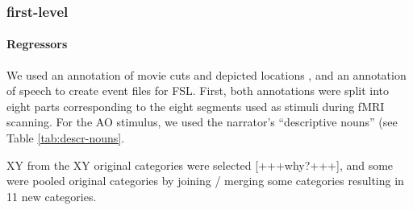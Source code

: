 \documentclass[english]{article}
\begin{document}
\subsubsection{first-level}
\paragraph{Regressors}
We used an annotation of movie cuts and depicted locations \citep{haeusler2016cutanno}, and an annotation of speech \citep{haeusler2020speechanno} to create event files for FSL.
First, both annotations were split into eight parts corresponding to the eight segments used as stimuli during fMRI scanning.
For the AO stimulus, we used the narrator's ``descriptive nouns'' (see Table \ref{tab:descr-nouns}.


XY from the XY original categories were selected [+++why?+++], and some were pooled  original categories by joining / merging some categories resulting in 11 new categories.
\end{document}

